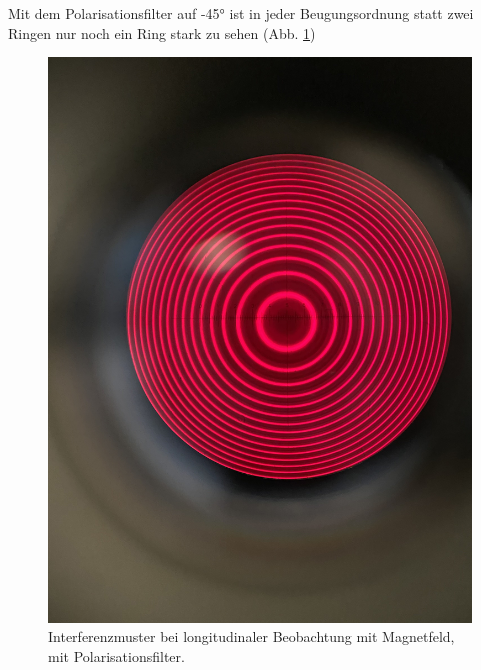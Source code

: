 \documentclass{article}
\begin{document}
\begin{multicols}{2}
Mit dem Polarisationsfilter auf \ang{-45} ist in jeder Beugungsordnung statt zwei Ringen nur noch ein Ring stark zu sehen (Abb. \ref{fig:zeeman-longitudinal-mit--45})
\begin{figure}[H]
  \centering
  \includegraphics[width=.8\linewidth]{zeeman-longitudinal-mit--45}
  \caption{Interferenzmuster bei longitudinaler Beobachtung mit Magnetfeld, mit Polarisationsfilter.}
  \label{fig:zeeman-longitudinal-mit--45}
\end{figure}


\end{multicols}
\end{document}
